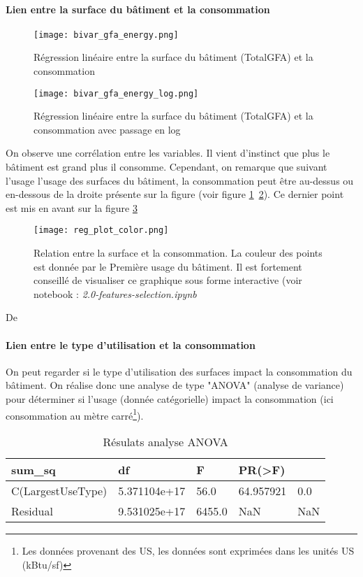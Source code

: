 \paragraph{Lien entre la surface du bâtiment et la consommation}

\begin{figure}[h!]
  \texttt{[image: bivar\_gfa\_energy.png]}
  \caption{Régression linéaire entre la surface du bâtiment (TotalGFA) et la
  consommation}
  \label{reg_1}
\end{figure}

\begin{figure}[h!]
  \texttt{[image: bivar\_gfa\_energy\_log.png]}
  \caption{Régression linéaire entre la surface du bâtiment (TotalGFA) et la
  consommation avec passage en log}
  \label{reg_2}
\end{figure}

On observe une corrélation entre les variables. Il vient d'instinct que plus
le bâtiment est grand plus il consomme. Cependant, on remarque que suivant l'usage
l'usage des surfaces du bâtiment, la consommation peut être au-dessus ou en-dessous
de la droite présente sur la figure (voir figure \ref{reg_1} \ref{reg_2}). Ce
dernier point est mis en avant sur la figure \ref{reg_3}

\begin{figure}[H]
  \texttt{[image: reg\_plot\_color.png]}
  \caption{Relation entre la surface et la consommation. La couleur des points
  est donnée par le Première usage du bâtiment. Il est fortement conseillé
  de visualiser ce graphique sous forme interactive (voir notebook : \emph{2.0-features-selection.ipynb}}
  \label{reg_3}
\end{figure}


De
\paragraph{Lien entre le type d'utilisation et la consommation}
On peut regarder si le type d'utilisation des surfaces impact la consommation du bâtiment.
On réalise donc une analyse de type "ANOVA" \cite{rutherford2001introducing}(analyse de variance) pour déterminer
si l'usage (donnée catégorielle) impact la consommation (ici consommation au mètre carré\footnote{Les données provenant des US, les données sont exprimées dans les unités US (kBtu/sf)}).

\begin{table*}[p]
  \centering
  \caption{Résulats analyse ANOVA}
\begin{tabular}{@{}lllll@{}}
\toprule
sum\_sq                   & df           & F      & PR(\textgreater{}F) &     \\ \midrule
C(LargestUseType) & 5.371104e+17 & 56.0   & 64.957921           & 0.0 \\
Residual                  & 9.531025e+17 & 6455.0 & NaN                 & NaN \\ \bottomrule
\end{tabular}
\end{table*}

